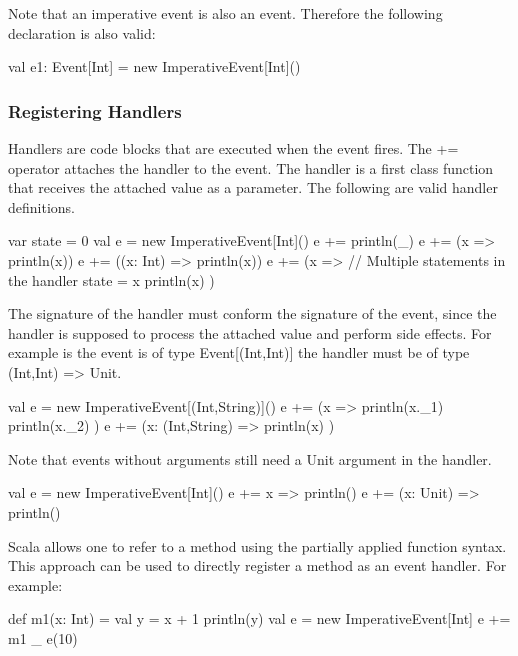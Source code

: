 \documentclass[10pt,a4paper]{article}
\newcommand{\code}[1]{{\fontfamily{cmtt}\small\selectfont#1}}
\begin{document}
Note that an imperative event is also an event. Therefore the
following declaration is also valid:

\begin{codenv}
val e1: Event[Int] = new ImperativeEvent[Int]()
\end{codenv}



\subsubsection{Registering Handlers}

Handlers are code blocks that are executed when the event fires. The
\code{+=} operator attaches the handler to the event. The handler is a
first class function that receives the attached value as a parameter.
The following are valid handler definitions.

\begin{codenv}
var state = 0
val e = new ImperativeEvent[Int]()
e += { println(_) }
e += (x => println(x))
e += ((x: Int) => println(x))
e += (x => {  // Multiple statements in the handler
  state = x
  println(x)
})
\end{codenv}

The signature of the handler must conform the signature of the event,
since the handler is supposed to process the attached value and
perform side effects. For example is the event is of type
\code{Event[(Int,Int)]} the handler must be of type \code{(Int,Int) =>
  Unit}.

\begin{codenv}
val e = new ImperativeEvent[(Int,String)]()
e += (x => {
  println(x._1)
  println(x._2)
})
e += (x: (Int,String) => {
  println(x)
})
\end{codenv}

Note that events without arguments still need a \code{Unit} argument
in the handler.

\begin{codenv}
val e = new ImperativeEvent[Int]()
e += { x => println() }
e += { (x: Unit) => println() }
\end{codenv}

Scala allows one to refer to a method using the partially applied
function syntax. This approach can be used to directly register a
method as an event handler. For example:

\begin{codenv}
def m1(x: Int) = {
  val y = x + 1
  println(y)
}
val e = new ImperativeEvent[Int]
e += m1 _
e(10)
\end{codenv}
\end{document}
